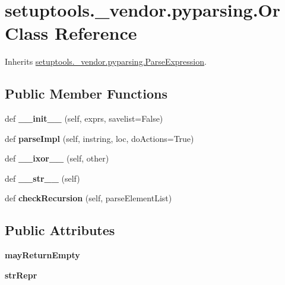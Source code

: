 \hypertarget{classsetuptools_1_1__vendor_1_1pyparsing_1_1_or}{}\section{setuptools.\+\_\+vendor.\+pyparsing.\+Or Class Reference}
\label{classsetuptools_1_1__vendor_1_1pyparsing_1_1_or}


Inherits \hyperlink{classsetuptools_1_1__vendor_1_1pyparsing_1_1_parse_expression}{setuptools.\+\_\+vendor.\+pyparsing.\+Parse\+Expression}.

\subsection*{Public Member Functions}
\begin{DoxyCompactItemize}
\item 
\mbox{\label{classsetuptools_1_1__vendor_1_1pyparsing_1_1_or_a68d209328487bf3f8e70efb3f9f7f114}} 
def {\bfseries \+\_\+\+\_\+init\+\_\+\+\_\+} (self, exprs, savelist=False)
\item 
\mbox{\label{classsetuptools_1_1__vendor_1_1pyparsing_1_1_or_a4b5bd6872dfe9002f590802f902328cd}} 
def {\bfseries parse\+Impl} (self, instring, loc, do\+Actions=True)
\item 
\mbox{\label{classsetuptools_1_1__vendor_1_1pyparsing_1_1_or_a18953323a799c8234ef73ce10a4afb72}} 
def {\bfseries \+\_\+\+\_\+ixor\+\_\+\+\_\+} (self, other)
\item 
\mbox{\label{classsetuptools_1_1__vendor_1_1pyparsing_1_1_or_ada6d1a60f3284ea741fe53ae77e7a38f}} 
def {\bfseries \+\_\+\+\_\+str\+\_\+\+\_\+} (self)
\item 
\mbox{\label{classsetuptools_1_1__vendor_1_1pyparsing_1_1_or_a3e7cea25c071116e2554f41c8bdc65d6}} 
def {\bfseries check\+Recursion} (self, parse\+Element\+List)
\end{DoxyCompactItemize}
\subsection*{Public Attributes}
\begin{DoxyCompactItemize}
\item 
\mbox{\label{classsetuptools_1_1__vendor_1_1pyparsing_1_1_or_a9fdd01868295eb0d39b27fa15bbabd14}} 
{\bfseries may\+Return\+Empty}
\item 
\mbox{\label{classsetuptools_1_1__vendor_1_1pyparsing_1_1_or_aad2de411355fe47546488fded5f3b696}} 
{\bfseries str\+Repr}
\end{DoxyCompactItemize}
